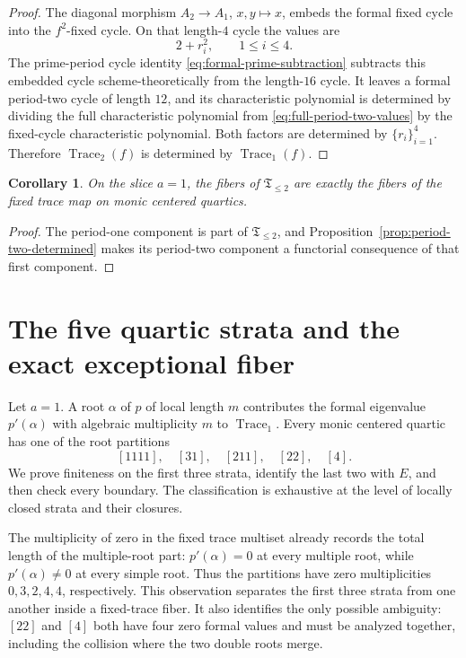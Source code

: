 \documentclass[11pt]{article}
\newtheorem{corollary}[theorem]{Corollary}
\theoremstyle{definition}
\newcommand{\Trace}{\operatorname{Trace}}
\begin{document}
\begin{proof}
The diagonal morphism $A_2\to A_1$, $x,y\mapsto x$, embeds the formal fixed cycle into the $f^2$-fixed cycle. On that length-$4$ cycle the values are
\[
2+r_i^2,
\qquad 1\le i\le4.
\]
The prime-period cycle identity \eqref{eq:formal-prime-subtraction} subtracts this embedded cycle scheme-theoretically from the length-$16$ cycle. It leaves a formal period-two cycle of length $12$, and its characteristic polynomial is determined by dividing the full characteristic polynomial from \eqref{eq:full-period-two-values} by the fixed-cycle characteristic polynomial. Both factors are determined by $\{r_i\}_{i=1}^4$. Therefore $\Trace_2(f)$ is determined by $\Trace_1(f)$.
\end{proof}

\begin{corollary}
\label{cor:conservative-reduction}
On the slice $a=1$, the fibers of $\mathfrak T_{\le2}$ are exactly the fibers of the fixed trace map on monic centered quartics.
\end{corollary}

\begin{proof}
The period-one component is part of $\mathfrak T_{\le2}$, and Proposition~\ref{prop:period-two-determined} makes its period-two component a functorial consequence of that first component.
\end{proof}

\section{The five quartic strata and the exact exceptional fiber}
\label{sec:strata}

Let $a=1$. A root $\alpha$ of $p$ of local length $m$ contributes the formal eigenvalue $p'(\alpha)$ with algebraic multiplicity $m$ to $\Trace_1$. Every monic centered quartic has one of the root partitions
\[
[1111],\quad[31],\quad[211],\quad[22],\quad[4].
\]
We prove finiteness on the first three strata, identify the last two with $E$, and then check every boundary. The classification is exhaustive at the level of locally closed strata and their closures.

The multiplicity of zero in the fixed trace multiset already records the total length of the multiple-root part: $p'(\alpha)=0$ at every multiple root, while $p'(\alpha)\ne0$ at every simple root. Thus the partitions have zero multiplicities $0,3,2,4,4$, respectively. This observation separates the first three strata from one another inside a fixed-trace fiber. It also identifies the only possible ambiguity: $[22]$ and $[4]$ both have four zero formal values and must be analyzed together, including the collision where the two double roots merge.
\end{document}

